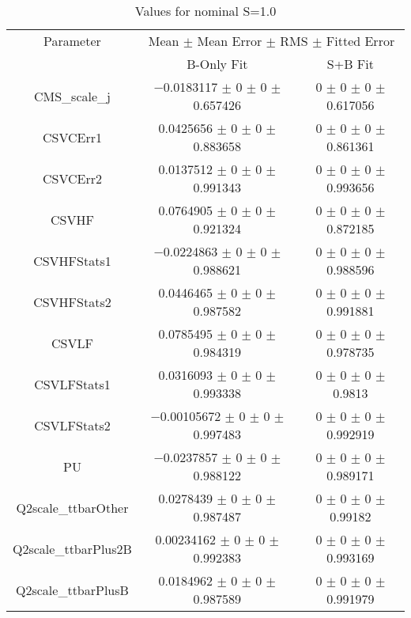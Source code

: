 \begin{table}
\centering
\caption{Values for nominal S=1.0}
\begin{tabular}{ccc}
\toprule
Parameter & \multicolumn{2}{c}{Mean $\pm$ Mean Error $\pm$ RMS $\pm$ Fitted Error}\\
 & B-Only Fit & S+B Fit\\
\midrule
CMS\_scale\_j & \num{-0.0183117} $\pm$ \num{0} $\pm$ \num{0} $\pm$ \num{0.657426} & \num{0} $\pm$ \num{0} $\pm$ \num{0} $\pm$ \num{0.617056}\\
CSVCErr1 & \num{0.0425656} $\pm$ \num{0} $\pm$ \num{0} $\pm$ \num{0.883658} & \num{0} $\pm$ \num{0} $\pm$ \num{0} $\pm$ \num{0.861361}\\
CSVCErr2 & \num{0.0137512} $\pm$ \num{0} $\pm$ \num{0} $\pm$ \num{0.991343} & \num{0} $\pm$ \num{0} $\pm$ \num{0} $\pm$ \num{0.993656}\\
CSVHF & \num{0.0764905} $\pm$ \num{0} $\pm$ \num{0} $\pm$ \num{0.921324} & \num{0} $\pm$ \num{0} $\pm$ \num{0} $\pm$ \num{0.872185}\\
CSVHFStats1 & \num{-0.0224863} $\pm$ \num{0} $\pm$ \num{0} $\pm$ \num{0.988621} & \num{0} $\pm$ \num{0} $\pm$ \num{0} $\pm$ \num{0.988596}\\
CSVHFStats2 & \num{0.0446465} $\pm$ \num{0} $\pm$ \num{0} $\pm$ \num{0.987582} & \num{0} $\pm$ \num{0} $\pm$ \num{0} $\pm$ \num{0.991881}\\
CSVLF & \num{0.0785495} $\pm$ \num{0} $\pm$ \num{0} $\pm$ \num{0.984319} & \num{0} $\pm$ \num{0} $\pm$ \num{0} $\pm$ \num{0.978735}\\
CSVLFStats1 & \num{0.0316093} $\pm$ \num{0} $\pm$ \num{0} $\pm$ \num{0.993338} & \num{0} $\pm$ \num{0} $\pm$ \num{0} $\pm$ \num{0.9813}\\
CSVLFStats2 & \num{-0.00105672} $\pm$ \num{0} $\pm$ \num{0} $\pm$ \num{0.997483} & \num{0} $\pm$ \num{0} $\pm$ \num{0} $\pm$ \num{0.992919}\\
PU & \num{-0.0237857} $\pm$ \num{0} $\pm$ \num{0} $\pm$ \num{0.988122} & \num{0} $\pm$ \num{0} $\pm$ \num{0} $\pm$ \num{0.989171}\\
Q2scale\_ttbarOther & \num{0.0278439} $\pm$ \num{0} $\pm$ \num{0} $\pm$ \num{0.987487} & \num{0} $\pm$ \num{0} $\pm$ \num{0} $\pm$ \num{0.99182}\\
Q2scale\_ttbarPlus2B & \num{0.00234162} $\pm$ \num{0} $\pm$ \num{0} $\pm$ \num{0.992383} & \num{0} $\pm$ \num{0} $\pm$ \num{0} $\pm$ \num{0.993169}\\
Q2scale\_ttbarPlusB & \num{0.0184962} $\pm$ \num{0} $\pm$ \num{0} $\pm$ \num{0.987589} & \num{0} $\pm$ \num{0} $\pm$ \num{0} $\pm$ \num{0.991979}\\

\end{tabular}
\end{table}
